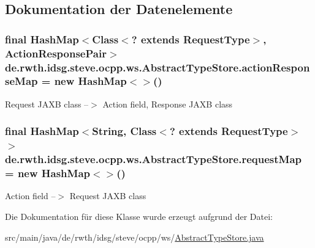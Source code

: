 \subsection{Dokumentation der Datenelemente}
\hypertarget{classde_1_1rwth_1_1idsg_1_1steve_1_1ocpp_1_1ws_1_1_abstract_type_store_ac58fed0b3c17c657e6dea4e1310c667f}{
\subsubsection[{action\-Response\-Map}]{\setlength{\rightskip}{0pt plus 5cm}final Hash\-Map$<$Class$<$? extends {\bf Request\-Type}$>$, {\bf Action\-Response\-Pair}$>$ de.\-rwth.\-idsg.\-steve.\-ocpp.\-ws.\-Abstract\-Type\-Store.\-action\-Response\-Map = new Hash\-Map$<$$>$()\hspace{0.3cm}{\ttfamily [protected]}}}\label{classde_1_1rwth_1_1idsg_1_1steve_1_1ocpp_1_1ws_1_1_abstract_type_store_ac58fed0b3c17c657e6dea4e1310c667f}
Request J\-A\-X\-B class --$>$ Action field, Response J\-A\-X\-B class \hypertarget{classde_1_1rwth_1_1idsg_1_1steve_1_1ocpp_1_1ws_1_1_abstract_type_store_a591ed9920192486ad695bbad5463cdc8}{
\subsubsection[{request\-Map}]{\setlength{\rightskip}{0pt plus 5cm}final Hash\-Map$<$String, Class$<$? extends {\bf Request\-Type}$>$ $>$ de.\-rwth.\-idsg.\-steve.\-ocpp.\-ws.\-Abstract\-Type\-Store.\-request\-Map = new Hash\-Map$<$$>$()\hspace{0.3cm}{\ttfamily [protected]}}}\label{classde_1_1rwth_1_1idsg_1_1steve_1_1ocpp_1_1ws_1_1_abstract_type_store_a591ed9920192486ad695bbad5463cdc8}
Action field --$>$ Request J\-A\-X\-B class 

Die Dokumentation für diese Klasse wurde erzeugt aufgrund der Datei\-:\begin{DoxyCompactItemize}
\item 
src/main/java/de/rwth/idsg/steve/ocpp/ws/\hyperlink{_abstract_type_store_8java}{Abstract\-Type\-Store.\-java}\end{DoxyCompactItemize}

